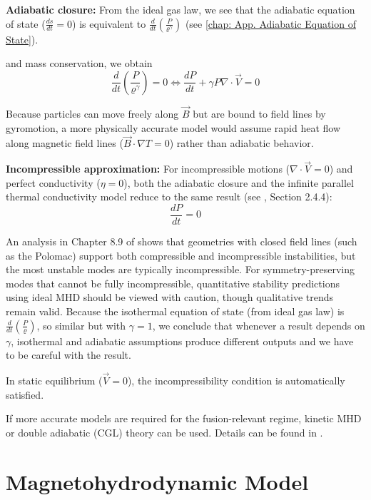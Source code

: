 \begin{enumerate}
\begin{enumerate}
    \textbf{Adiabatic closure:}
    From the ideal gas law, we see that the adiabatic equation of state ($\frac{ds}{dt}=0$) is equivalent
     to $\frac{d}{dt}(\frac{P}{\varrho^\gamma})$ (see \autoref{chap: App. Adiabatic Equation of State}).
    
    and mass conservation, we obtain
    \[
        \frac{d}{dt}\left(\frac{P}{\varrho^\gamma}\right) = 0 \iff \frac{dP}{dt} + \gamma P \nabla \cdot \vec{V} = 0
    \]
    
    Because particles can move freely along $\vec{B}$ but are bound to field lines by gyromotion, 
    a more physically accurate model would assume rapid heat flow along magnetic field lines 
    ($\vec{B}\cdot\nabla T = 0$) rather than adiabatic behavior.

    \textbf{Incompressible approximation:} For incompressible motions ($\nabla \cdot \vec{V} = 0$) 
    and perfect conductivity ($\eta = 0$), both the adiabatic closure and the infinite parallel 
    thermal conductivity model reduce to the same result (see \cite{Freidberg2014}, Section 2.4.4):
    \[
    \frac{dP}{dt} = 0
    \]

    An analysis in Chapter 8.9 of \cite{Freidberg2014} shows that geometries with closed field lines 
    (such as the Polomac) support both compressible and incompressible instabilities, but the most 
    unstable modes are typically incompressible. For symmetry-preserving modes that cannot be fully 
    incompressible, quantitative stability predictions using ideal MHD should be viewed with caution, 
    though qualitative trends remain valid.
    Because the isothermal equation of state (from ideal gas law) is $\frac{d}{dt}(\frac{P}{\varrho})$,
    so similar but with $\gamma=1$, we conclude that whenever a result depends on $\gamma$, isothermal
    and adiabatic assumptions produce different outputs and we have to be careful with the result.


    In static equilibrium ($\vec{V} = 0$), the incompressibility condition is automatically satisfied.

    If more accurate models are required for the fusion-relevant regime, kinetic MHD or double 
    adiabatic (CGL) theory can be used. Details can be found in \cite{Freidberg2014}.





\end{enumerate}

{\color{magenta}

\section{Magnetohydrodynamic Model}

}
\end{enumerate}
